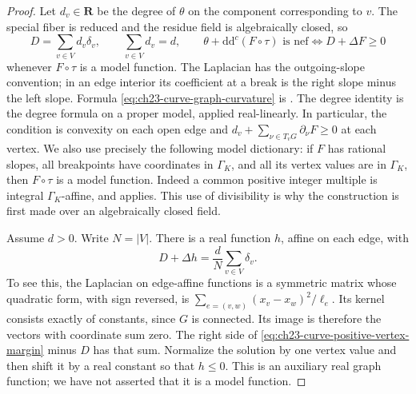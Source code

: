 \begin{proof}
Let $d_v\in\mathbf R$ be the degree of $\theta$ on the component
corresponding to $v$.  The special fiber is reduced and the residue field
is algebraically closed, so
\begin{equation}
\label{eq:ch23-curve-graph-curvature}
 D=\sum_{v\in V}d_v\delta_v,
 \qquad \sum_{v\in V}d_v=d,
 \qquad
 \theta+\mathrm d\mathrm d^c(F\circ\tau)\text{ is nef}
       \Longleftrightarrow D+\Delta F\geq0
\end{equation}
whenever $F\circ\tau$ is a model function.  The Laplacian has the
outgoing-slope convention; in an edge interior its coefficient at a break
is the right slope minus the left slope.  Formula
\eqref{eq:ch23-curve-graph-curvature} is
\cite[Proposition~3.7]{GJKM19}.  The degree identity is the degree
formula on a proper model, applied real-linearly.  In particular, the
condition is convexity on each open edge and
$d_v+\sum_{\nu\in T_vG}\partial_\nu F\geq0$ at each vertex.
We also use precisely the following model dictionary:
if $F$ has rational slopes, all breakpoints have coordinates in
$\Gamma_K$, and all its vertex values are in $\Gamma_K$, then
$F\circ\tau$ is a model function.  Indeed a common positive integer
multiple is integral $\Gamma_K$-affine, and
\cite[Proposition~3.5(3)]{GJKM19} applies.  This use of divisibility is
why the construction is first made over an algebraically closed field.

Assume $d>0$.  Write $N=|V|$.  There is a real function $h$, affine on
each edge, with
\begin{equation}
\label{eq:ch23-curve-positive-vertex-margin}
 D+\Delta h=\frac dN\sum_{v\in V}\delta_v.
\end{equation}
To see this, the Laplacian on edge-affine functions is a symmetric
matrix whose quadratic form, with sign reversed, is
$\sum_{e=(v,w)}(x_v-x_w)^2/\ell_e$.  Its kernel consists exactly of
constants, since $G$ is connected.  Its image is therefore the vectors
with coordinate sum zero.  The right side of
\eqref{eq:ch23-curve-positive-vertex-margin} minus $D$ has that sum.
Normalize the solution by one vertex value and then shift it by a real
constant so that $h\leq0$.  This is an auxiliary real graph function;
we have not asserted that it is a model function.


\end{proof}
